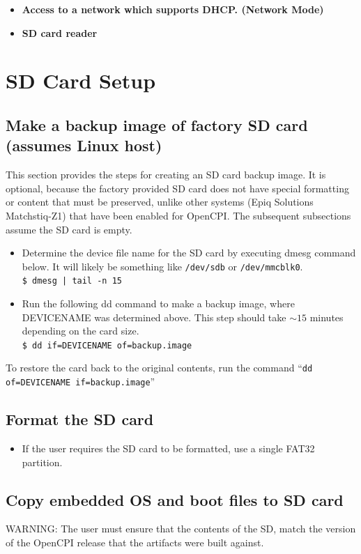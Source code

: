 \begin{flushleft}
\begin{itemize}
\item \textbf{Access to a network which supports DHCP. (Network Mode)}

\item \textbf{SD card reader}
\end{itemize}
\end{flushleft}

\pagebreak
\section{SD Card Setup}
\label{sec:SD_Card_Setup}
\subsection{Make a backup image of factory SD card (assumes Linux host)}
This section provides the steps for creating an SD card backup image. It is optional, because the factory provided SD card does not have special formatting or content that must be preserved, unlike other systems (Epiq Solutions Matchstiq-Z1) that have been enabled for OpenCPI. The subsequent subsections assume the SD card is empty.

\begin{itemize}
\item Determine the device file name for the SD card by executing dmesg command below. It will likely be something like \texttt{/dev/sdb} or \texttt{/dev/mmcblk0}.\\
\texttt{\$ dmesg | tail -n 15} \\
\item Run the following dd command to make a backup image, where DEVICENAME was determined above. This step should take $\sim15$ minutes depending on the card size.\\ \medskip
\texttt{\$ dd if=DEVICENAME of=backup.image}
\end{itemize}
\noindent To restore the card back to the original contents, run the command ``\texttt{dd of=DEVICENAME if=backup.image}''

\subsection{Format the SD card}
\begin{itemize}
\item If the user requires the SD card to be formatted, use a single FAT32 partition.
\end{itemize}

\subsection{Copy embedded OS and boot files to SD card}
\label{sec:Copy embedded OS and boot files to SD card}
WARNING: The user must ensure that the contents of the SD, match the version of the OpenCPI release that the artifacts were built against.\\

